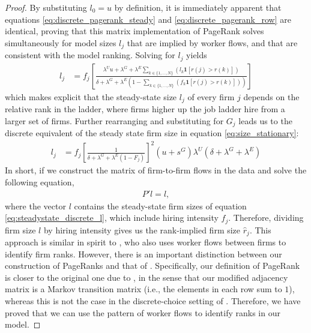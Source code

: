 \begin{proof}
    By substituting $l_{0} = u$ by definition, it is immediately apparent that equations \eqref{eq:discrete_pagerank_steady} and \eqref{eq:discrete_pagerank_row} are identical, proving that this matrix implementation of PageRank solves simultaneously for model sizes $l_j$ that are implied by worker flows, and that are consistent with the model ranking. Solving for $l_j$ yields
    \begin{align}
        l_{j} &= f_{j} \left[ \frac{ \lambda^{U}  u + \lambda^{G} + \lambda^{E} \sum_{k \in \{1, \ldots, N\}} (l_k \mathbf{1}[r(j) > r(k)]) }{ \delta + \lambda^{G} + \lambda^{E} \left(1 - \sum_{k \in \{1, \ldots, N\}} (f_k \mathbf{1}[r(j)>r(k)]) \right)} \right]
    \end{align}
    which makes explicit that the steady-state size $l_{j}$ of every firm $j$ depends on the relative rank in the ladder, where firms higher up the job ladder hire from a larger set of firms. Further rearranging and substituting for $G_{j}$ leads us to the discrete equivalent of the steady state firm size in equation \eqref{eq:size_stationary}:
    \begin{align}
        l_{j} &= f_{j} \left[\frac{1}{{ \delta + \lambda^{G} + \lambda^{E} (1 - F_{j}) }} \right]^2 (u + s^{G}) \lambda^{U} (\delta + \lambda^{G} + \lambda^{E}) \label{eq:steadystate_discrete_l}
    \end{align}
    In short, if we construct the matrix of firm-to-firm flows in the data and solve the following equation,
    \begin{align}
        \label{eq:matrix_steady_state}
        P' l = l,
    \end{align}
    where the vector $l$ contains the steady-state firm sizes of equation \eqref{eq:steadystate_discrete_l}, which include hiring intensity $f_{j}$. Therefore, dividing firm size $l$ by hiring intensity gives us the rank-implied firm size $\hat{r}_{j}$. This approach is similar in spirit to \citet{Sorkin2018}, who also uses worker flows between firms to identify firm ranks. However, there is an important distinction between our construction of PageRanks and that of \citet{Sorkin2018}. Specifically, our definition of PageRank is closer to the original one due to \citet{PageBrinMotwaniWinograd1999}, in the sense that our modified adjacency matrix is a Markov transition matrix (i.e., the elements in each row sum to $1$), whereas this is not the case in the discrete-choice setting of \citet{Sorkin2018}. %
    Therefore, we have proved that we can use the pattern of worker flows to identify ranks in our model.
\end{proof}
%



